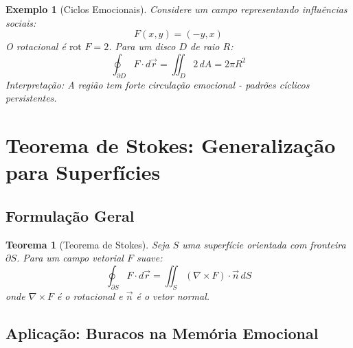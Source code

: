 \documentclass[12pt, a4paper]{article}
\newtheorem{theorem}{Teorema}
\newtheorem{example}{Exemplo}
\begin{document}
\begin{example}[Ciclos Emocionais]
Considere um campo representando influências sociais:
\[
F(x,y) = (-y, x)
\]
O rotacional é $\text{rot } F = 2$. Para um disco $D$ de raio $R$:
\[
\oint_{\partial D} F \cdot d\vec{r} = \iint_D 2 \, dA = 2\pi R^2
\]
Interpretação: A região tem forte circulação emocional - padrões cíclicos persistentes.
\end{example}

\section{Teorema de Stokes: Generalização para Superfícies}

\subsection{Formulação Geral}

\begin{theorem}[Teorema de Stokes]
Seja $S$ uma superfície orientada com fronteira $\partial S$. Para um campo vetorial $F$ suave:
\[
\oint_{\partial S} F \cdot d\vec{r} = \iint_S (\nabla \times F) \cdot \vec{n} \, dS
\]
onde $\nabla \times F$ é o rotacional e $\vec{n}$ é o vetor normal.
\end{theorem}

\subsection{Aplicação: Buracos na Memória Emocional}

\begin{center}
\end{center}
\end{document}
